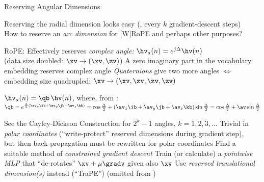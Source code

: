 \begin{slide}[\slideopts,toc={Reservations}]{Reserving Angular Dimensions}

  \vspace{-1em}

  Reserving the radial dimension looks easy (\eg,  every $k$ gradient-descent steps)\\
  How to reserve an \emph{arc dimension} for [W]RoPE and perhaps other purposes?

  \begin{itemize}
      \mpitem RoPE: Effectively reserves \emph{complex angle:} $\hv_a(n) = e^{j\Delta}\hv(n)$\\
      (data size doubled: $\xv \to (\xv,\zv)$)
      \mpitem A zero imaginary part in the vocabulary embedding reserves complex angle %
      \mpitem \emph{Quaternions} give two more angles
      		$\Leftrightarrow$ embedding size quadrupled: $\xv \to (\xv,\zv,\zv,\zv)$\\
      \begin{itemize}
        \mpitem $\hv_a(n) = \qb\,\hv(n)$, where, from
        :\\
        $
        \qb = e^{{\frac {\Delta}{2}}{(\av_x\ib +\av_y\jb +\av_z\kb )}}
        = \cos {\frac {\Delta }{2}}+(\av_x\ib +\av_y\jb + \av_z\kb )\sin {\frac {\Delta }{2}}
        = \cos {\frac {\Delta }{2}}+\av\sin {\frac {\Delta }{2}}
        $
      \end{itemize}
      \mpitem See the Cayley-Dickson Construction for $2^k-1$ angles, $k=1,2,3,\ldots$
      \mpitem Trivial in \emph{polar coordinates} (``write-protect'' reserved dimensions during gradient step),\\
      but then back-propagation must be rewritten for polar coordinates
      \mpitem Find a suitable method of \emph{constrained gradient descent}
      \mpitem Train (or calculate) a \emph{pointwise MLP} that ``de-rotates'' $\xv+\mu\gradv$ given also $\xv$
      \mpitem Use \emph{reserved translational dimension(s)} instead (``TraPE'') (omitted from )
  \end{itemize}

\end{slide}

